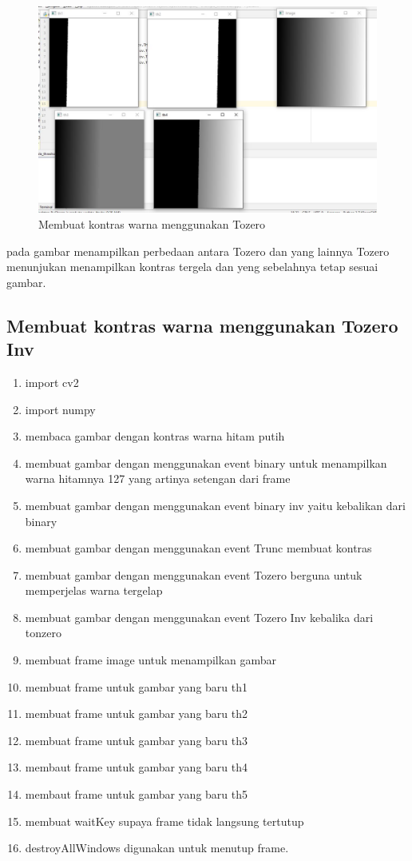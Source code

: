 \newpage
\begin{figure}[ht]
\centering
\includegraphics[scale=0.42]{figures/2,41.jpg}
\caption{Membuat kontras warna menggunakan Tozero}
\label{contoh}
\end{figure}
pada gambar menampilkan perbedaan antara Tozero dan yang lainnya Tozero menunjukan menampilkan kontras tergela dan yeng sebelahnya tetap sesuai gambar.



\newpage
\subsection{Membuat kontras warna menggunakan Tozero Inv}

\begin{enumerate}
	\item import cv2
	\item import numpy
	\item membaca gambar dengan kontras warna hitam putih
	\item membuat gambar dengan menggunakan event binary untuk menampilkan warna hitamnya 127 yang artinya setengan dari frame
	\item membuat gambar dengan menggunakan event binary inv yaitu kebalikan dari binary
	\item membuat gambar dengan menggunakan event Trunc membuat kontras 
	\item membuat gambar dengan menggunakan event Tozero berguna untuk memperjelas warna tergelap
	\item membuat gambar dengan menggunakan event Tozero Inv kebalika dari tonzero
	\item membuat frame image untuk menampilkan gambar
	\item membuat frame untuk gambar yang baru th1
	\item membuat frame untuk gambar yang baru th2
	\item membuat frame untuk gambar yang baru th3
	\item membaut frame untuk gambar yang baru th4
	\item membaut frame untuk gambar yang baru th5
	\item membuat waitKey supaya frame tidak langsung tertutup
	\item destroyAllWindows digunakan untuk menutup frame.
\end{enumerate}

